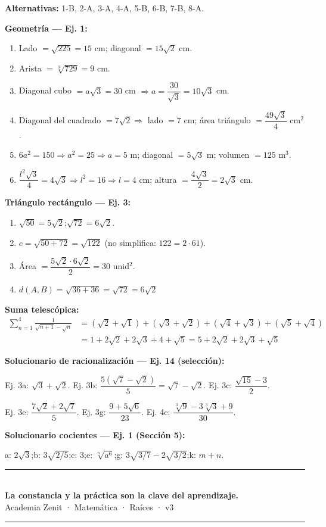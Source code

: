 \documentclass[11pt, letterpaper]{article}
\begin{document}
\begin{tcolorbox}[answerbox, title={Respuestas}]
\textbf{Alternativas:} 1-B, 2-A, 3-A, 4-A, 5-B, 6-B, 7-B, 8-A.

\medskip
\textbf{Geometría — Ej. 1:}
\begin{enumerate}[label=\alph*)]
  \item Lado $=\sqrt{225}=15$ cm; diagonal $=15\sqrt{2}$ cm.
  \item Arista $=\sqrt[3]{729}=9$ cm.
  \item Diagonal cubo $=a\sqrt{3}=30$ cm $\Rightarrow a=\dfrac{30}{\sqrt{3}}=10\sqrt{3}$ cm.
  \item Diagonal del cuadrado $=7\sqrt{2}\Rightarrow$ lado $=7$ cm; área triángulo $=\dfrac{49\sqrt{3}}{4}$ cm$^2$.
  \item $6a^2=150\Rightarrow a^2=25\Rightarrow a=5$ m; diagonal $=5\sqrt{3}$ m; volumen $=125$ m$^3$.
  \item $\dfrac{l^2\sqrt{3}}{4}=4\sqrt{3}\Rightarrow l^2=16\Rightarrow l=4$ cm; altura $=\dfrac{4\sqrt{3}}{2}=2\sqrt{3}$ cm.
\end{enumerate}

\medskip
\textbf{Triángulo rectángulo — Ej. 3:}
\begin{enumerate}[label=\alph*)]
  \item $\sqrt{50}=5\sqrt{2}$;\quad $\sqrt{72}=6\sqrt{2}$.
  \item $c=\sqrt{50+72}=\sqrt{122}$ (no simplifica: $122=2\cdot 61$).
  \item Área $=\dfrac{5\sqrt{2}\cdot 6\sqrt{2}}{2}=30$ unid$^2$.
  \item $d(A,B)=\sqrt{36+36}=\sqrt{72}=6\sqrt{2}$ \checkmark
\end{enumerate}

\medskip
\textbf{Suma telescópica:}
\begin{align*}
\sum_{n=1}^{4}\frac{1}{\sqrt{n+1}-\sqrt{n}}&=(\sqrt{2}+\sqrt{1})+(\sqrt{3}+\sqrt{2})+(\sqrt{4}+\sqrt{3})+(\sqrt{5}+\sqrt{4})\\
&=1+2\sqrt{2}+2\sqrt{3}+4+\sqrt{5}=5+2\sqrt{2}+2\sqrt{3}+\sqrt{5}
\end{align*}

\medskip
\textbf{Solucionario de racionalización — Ej. 14 (selección):}

Ej. 3a: $\sqrt{3}+\sqrt{2}$. \quad Ej. 3b: $\dfrac{5(\sqrt{7}-\sqrt{2})}{5}=\sqrt{7}-\sqrt{2}$. \quad Ej. 3c: $\dfrac{\sqrt{15}-3}{2}$.

Ej. 3e: $\dfrac{7\sqrt{2}+2\sqrt{7}}{5}$. \quad Ej. 3g: $\dfrac{9+5\sqrt{6}}{23}$. \quad Ej. 4c: $\dfrac{\sqrt[3]{9}-3\sqrt[3]{3}+9}{30}$.

\medskip
\textbf{Solucionario cocientes — Ej. 1 (Sección 5):}

a: $2\sqrt{3}$;\quad b: $3\sqrt{2/5}$;\quad c: $3$;\quad e: $\sqrt[n]{a^6}$;\quad g: $3\sqrt{3/7}-2\sqrt{3/2}$;\quad k: $m+n$.
\end{tcolorbox}

\vspace{8pt}
\begin{center}
  \rule{\linewidth}{1.5pt}\\[4pt]
  {\large\bfseries\color{zenitnavy} La constancia y la práctica son la clave del aprendizaje.}\\[2pt]
  {\color{zenitgold}\small Academia Zenit · Matemática · Raíces · v3}
  \rule{\linewidth}{1.5pt}
\end{center}
\end{document}
